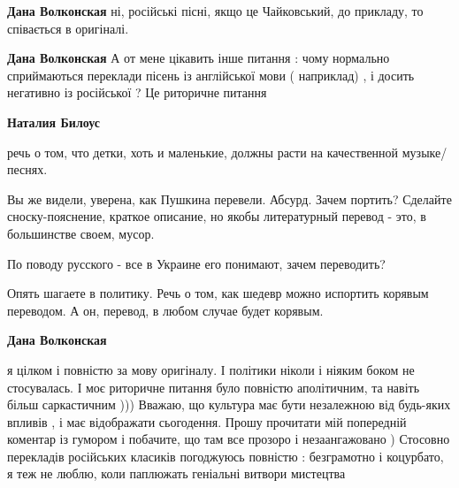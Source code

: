 \begin{itemize}
\begin{itemize}
\begin{itemize}
\textbf{Дана Волконская} ні, російські пісні, якщо це Чайковський, до прикладу, то співається в оригіналі.
\end{itemize}

 
\textbf{Дана Волконская} 
А от мене цікавить інше питання : чому нормально сприймаються переклади пісень
із англійської мови ( наприклад) , і досить негативно із російської ? Це
риторичне питання

\begin{itemize}
 
\textbf{Наталия Билоус} 

речь о том, что детки, хоть и маленькие, должны расти на качественной
музыке/песнях.

Вы же видели, уверена, как Пушкина перевели. Абсурд. Зачем портить? Сделайте
сноску-пояснение, краткое описание, но якобы литературный перевод - это, в
большинстве своем, мусор.

По поводу русского - все в Украине его понимают, зачем переводить?

Опять шагаете в политику. Речь о том, как шедевр можно испортить корявым
переводом. А он, перевод, в любом случае будет корявым.

 
\textbf{Дана Волконская} 

я цілком і повністю за мову оригіналу. І політики ніколи і ніяким боком не
стосувалась. І моє риторичне питання було повністю аполітичним, та навіть більш
саркастичним ))) Вважаю, що культура має бути незалежною від будь-яких впливів
, і має відображати сьогодення. Прошу прочитати мій попередній коментар із
гумором і побачите, що там все прозоро і незаангажовано ) Стосовно перекладів
російських класиків погоджуюсь повністю : безграмотно і коцурбато, я теж не
люблю, коли паплюжать геніальні витвори мистецтва


\end{itemize}
\end{itemize}
\end{itemize}
